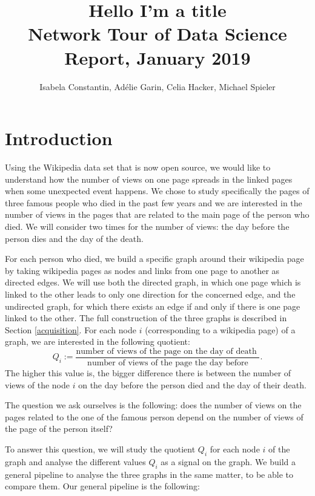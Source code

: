 \documentclass[conference]{IEEEtran}
\begin{document}
\title{Hello I'm a title\\
{\footnotesize Network Tour of Data Science Report, January 2019}
}

\author{Isabela Constantin, Ad\'elie Garin, Celia Hacker, Michael Spieler}

\maketitle

\section{Introduction}
Using the Wikipedia data set that is now open source, we would like to understand how the number of views on one page spreads in the linked pages when some unexpected event happens. We chose to study specifically the pages of three famous people who died in the past few years and we are interested in the number of views in the pages that are related to the main page of the person who died. We will consider two times for the number of views: the day before the person dies and the day of the death. 

\medskip

For each person who died, we build a specific graph around their wikipedia page by taking wikipedia pages as nodes and links from one page to another as directed edges. We will use both the directed graph, in which one page which is linked to the other leads to only one direction for the concerned edge, and the undirected graph, for which there exists an edge if and only if there is one page linked to the other. The full construction of the three graphs is described in Section \ref{acquisition}. For each node $i$ (corresponding to a wikipedia page) of a graph, we are interested in the following quotient: \[Q_i:=\frac{\text{number of views of the page on the day of death }}{\text{number of views of the page the day before}}.\] The higher this value is, the bigger difference there is between the number of views of the node $i$ on the day before the person died and the day of their death. 

\medskip

The question we ask ourselves is the following: does the number of views on the pages related to the one of the famous person depend on the number of views of the page of the person itself? 

\medskip

To answer this question, we will study the quotient $Q_i$ for each node $i$ of the graph and analyse the different values $Q_i$  as a signal on the graph. We build a general pipeline to analyse the three graphs in the same matter, to be able to compare them. Our general pipeline is the following: 
\end{document}
